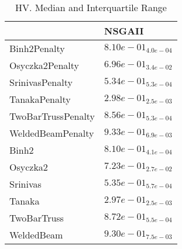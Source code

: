 \documentclass{article}
\begin{document}
\begin{table}
\caption{HV. Median and Interquartile Range}
\label{table: HV}
\centering
\begin{scriptsize}
\begin{tabular}{ll}
\hline &  NSGAII\\
\hline 
Binh2Penalty & \cellcolor{gray95}$  8.10e-01_{ 4.0e-04}$ \\
Osyczka2Penalty & \cellcolor{gray95}$  6.96e-01_{ 3.4e-02}$ \\
SrinivasPenalty & \cellcolor{gray95}$  5.34e-01_{ 5.3e-04}$ \\
TanakaPenalty & \cellcolor{gray95}$  2.98e-01_{ 2.5e-03}$ \\
TwoBarTrussPenalty & \cellcolor{gray95}$  8.56e-01_{ 5.3e-04}$ \\
WeldedBeamPenalty & \cellcolor{gray95}$  9.33e-01_{ 6.9e-03}$ \\
Binh2 & \cellcolor{gray95}$  8.10e-01_{ 4.1e-04}$ \\
Osyczka2 & \cellcolor{gray95}$  7.23e-01_{ 2.7e-02}$ \\
Srinivas & \cellcolor{gray95}$  5.35e-01_{ 5.7e-04}$ \\
Tanaka & \cellcolor{gray95}$  2.97e-01_{ 2.5e-03}$ \\
TwoBarTruss & \cellcolor{gray95}$  8.72e-01_{ 5.5e-04}$ \\
WeldedBeam & \cellcolor{gray95}$  9.30e-01_{ 7.5e-03}$ \\
\hline
\end{tabular}
\end{scriptsize}
\end{table}
\end{document}
